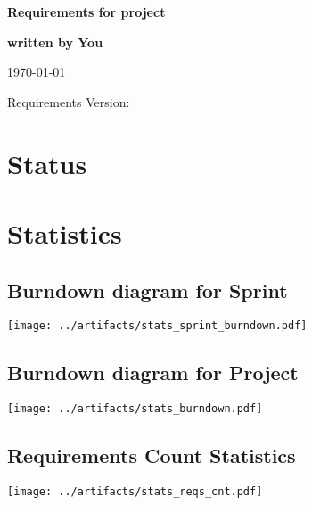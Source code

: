 \documentclass{report}
\begin{document}
\thispagestyle{empty}

\mbox{}

\vfill

{\LARGE\textbf{Requirements for project}}

\vfill

{\Large\textbf{written by You}}

\vfill

\today

\vfill

Requirements Version: 

\vfill

\newpage

\tableofcontents

\newpage

\chapter{Status}




\appendix


\chapter{Statistics}
\section{Burndown diagram for Sprint}
\texttt{[image: ../artifacts/stats\_sprint\_burndown.pdf]}

\section{Burndown diagram for Project}
\texttt{[image: ../artifacts/stats\_burndown.pdf]}

\section{Requirements Count Statistics}
\texttt{[image: ../artifacts/stats\_reqs\_cnt.pdf]}
\end{document}
